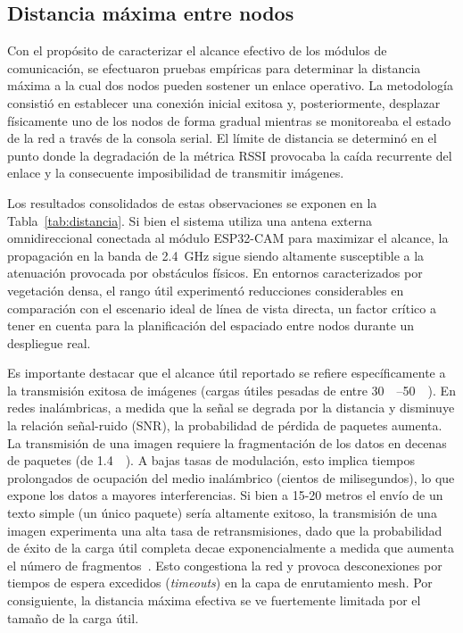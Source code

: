 \documentclass[a4paper, 12pt]{report}
\begin{document}
\subsection{Distancia máxima entre nodos}

Con el propósito de caracterizar el alcance efectivo de los módulos de comunicación, se efectuaron pruebas empíricas para determinar la distancia máxima a la cual dos nodos pueden sostener un enlace operativo. La metodología consistió en establecer una conexión inicial exitosa y, posteriormente, desplazar físicamente uno de los nodos de forma gradual mientras se monitoreaba el estado de la red a través de la consola serial. El límite de distancia se determinó en el punto donde la degradación de la métrica RSSI provocaba la caída recurrente del enlace y la consecuente imposibilidad de transmitir imágenes.

Los resultados consolidados de estas observaciones se exponen en la Tabla~\ref{tab:distancia}. Si bien el sistema utiliza una antena externa omnidireccional conectada al módulo ESP32-CAM para maximizar el alcance, la propagación en la banda de \qty{2.4}{\giga\hertz} sigue siendo altamente susceptible a la atenuación provocada por obstáculos físicos. En entornos caracterizados por vegetación densa, el rango útil experimentó reducciones considerables en comparación con el escenario ideal de línea de vista directa, un factor crítico a tener en cuenta para la planificación del espaciado entre nodos durante un despliegue real.

Es importante destacar que el alcance útil reportado se refiere específicamente a la transmisión exitosa de imágenes (cargas útiles pesadas de entre \qtyrange{30}{50}{\kilo\byte}). En redes inalámbricas, a medida que la señal se degrada por la distancia y disminuye la relación señal-ruido (SNR), la probabilidad de pérdida de paquetes aumenta. La transmisión de una imagen requiere la fragmentación de los datos en decenas de paquetes (de \qty{1,4}{\kilo\byte}). A bajas tasas de modulación, esto implica tiempos prolongados de ocupación del medio inalámbrico (cientos de milisegundos), lo que expone los datos a mayores interferencias. Si bien a 15-20 metros el envío de un texto simple (un único paquete) sería altamente exitoso, la transmisión de una imagen experimenta una alta tasa de retransmisiones, dado que la probabilidad de éxito de la carga útil completa decae exponencialmente a medida que aumenta el número de fragmentos~\cite{sankarasubramaniam2003energy}. Esto congestiona la red y provoca desconexiones por tiempos de espera excedidos (\textit{timeouts}) en la capa de enrutamiento \gls{mesh}. Por consiguiente, la distancia máxima efectiva se ve fuertemente limitada por el tamaño de la carga útil.
\end{document}
